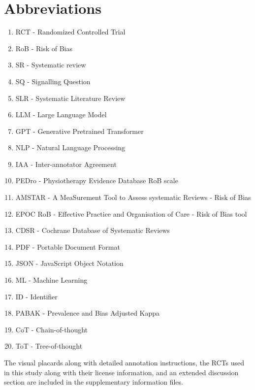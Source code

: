 \documentclass[sn-mathphys,Numbered]{sn-jnl}%
\theoremstyle{thmstyleone}%
\theoremstyle{thmstyletwo}%
\theoremstyle{thmstylethree}%
\begin{document}
\section{Abbreviations}%
%
\begin{enumerate}
    \item RCT - Randomized Controlled Trial
    \item RoB - Risk of Bias
    \item SR - Systematic review
    \item SQ - Signalling Question
    \item SLR - Systematic Literature Review
    \item LLM - Large Language Model
    \item GPT - Generative Pretrained Transformer
    \item NLP - Natural Language Processing
    \item IAA - Inter-annotator Agreement
    \item PEDro - Physiotherapy Evidence Database RoB scale
    \item AMSTAR - A MeaSurement Tool to Assess systematic Reviews - Risk of Bias
    \item EPOC RoB - Effective Practice and Organisation of Care - Risk of Bias tool
    \item CDSR - Cochrane Database of Systematic Reviews
    \item PDF - Portable Document Format
    \item JSON - JavaScript Object Notation
    \item ML - Machine Learning
    \item ID - Identifier
    \item PABAK - Prevalence and Bias Adjusted Kappa
    \item CoT - Chain-of-thought
    \item ToT - Tree-of-thought
\end{enumerate}
%
%
%
\backmatter

%
The visual placards along with detailed annotation instructions, the RCTs used in this study along with their license information, and an extended discussion section are included in the supplementary information files.
%
%
%


%
%
%
\end{document}
